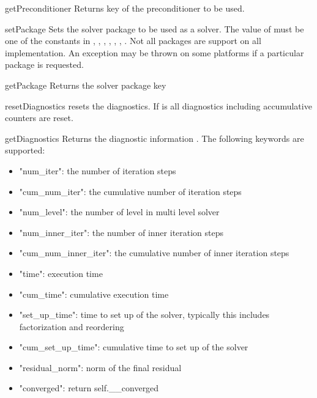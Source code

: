 \begin{methoddesc}[SolverOptions]{getPreconditioner}{}
Returns key of the preconditioner to be used. 
\end{methoddesc}

\begin{methoddesc}[SolverOptions]{setPackage}{}
Sets the solver package to be used as a solver.  
The value of  must be one of the constants in , , , , , , .
Not all packages are support on all implementation. An exception may be thrown on some platforms if a particular package is requested. 
\end{methoddesc}

\begin{methoddesc}[SolverOptions]{getPackage}{}
Returns the solver package key
\end{methoddesc}


\begin{methoddesc}[SolverOptions]{resetDiagnostics}{}
resets the diagnostics. If  is \True all diagnostics including accumulative counters are reset.
\end{methoddesc}

\begin{methoddesc}[SolverOptions]{getDiagnostics}{}
Returns the diagnostic information . The following keywords are
supported:
\begin{itemize}
 \item "num_iter": the number of iteration steps
 \item "cum_num_iter": the cumulative number of iteration steps
 \item "num_level": the number of level in multi level solver
 \item "num_inner_iter": the number of inner iteration steps
 \item"cum_num_inner_iter": the cumulative number of inner iteration steps
 \item"time": execution time 
 \item "cum_time": cumulative execution time
 \item "set_up_time": time to set up of the solver, typically this includes factorization and reordering
 \item "cum_set_up_time": cumulative time to set up of the solver
 \item "residual_norm": norm of the final residual
 \item "converged": return self.__converged     
\end{itemize}
\end{methoddesc}


